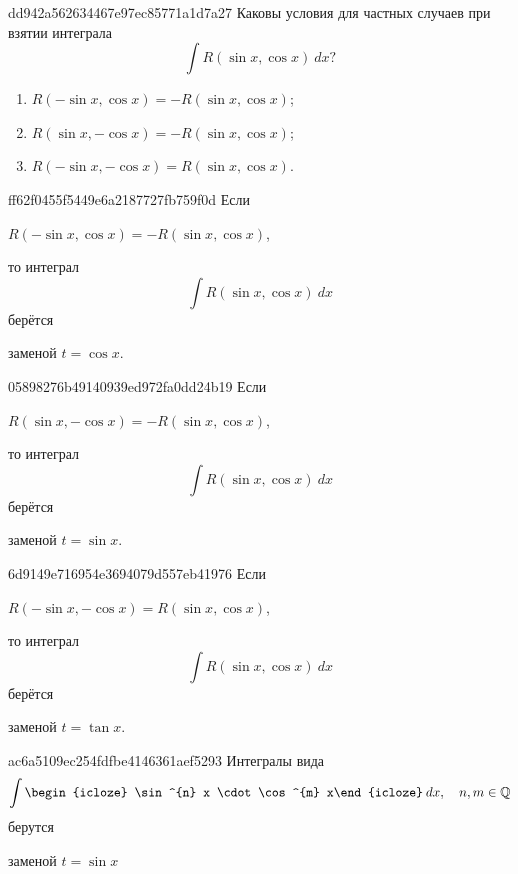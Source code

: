 \begin{note}{dd942a562634467e97ec85771a1d7a27}
    Каковы условия для частных случаев при взятии интеграла
    \[
        \int R(\sin x,  \cos x)\: dx?
    \]

    \begin{cloze}{1}
        \begin{enumerate}
            \item \({ R(-\sin x, \cos x) = -R(\sin x, \cos x) }\);
            \item \({ R(\sin x, -\cos x) = -R(\sin x, \cos x) }\);
            \item \({ R(-\sin x, -\cos x) = R(\sin x, \cos x) }\).
        \end{enumerate}
    \end{cloze}
\end{note}

\begin{note}{ff62f0455f5449e6a2187727fb759f0d}
    Если \begin{icloze}{2}\({ R(-\sin x, \cos x) = -R(\sin x, \cos x) }\),\end{icloze} то интеграл
    \[
        \int R(\sin x, \cos x)\: dx
    \]
    берётся \begin{icloze}{1}заменой \({ t = \cos x }\).\end{icloze}
\end{note}

\begin{note}{05898276b49140939ed972fa0dd24b19}
    Если \begin{icloze}{2}\({ R(\sin x, -\cos x) = -R(\sin x, \cos x) }\),\end{icloze} то интеграл
    \[
        \int R(\sin x, \cos x)\: dx
    \]
    берётся \begin{icloze}{1}заменой \({ t = \sin x }\).\end{icloze}
\end{note}

\begin{note}{6d9149e716954e3694079d557eb41976}
    Если \begin{icloze}{2}\({ R(-\sin x, -\cos x) = R(\sin x, \cos x) }\),\end{icloze} то интеграл
    \[
        \int R(\sin x, \cos x)\: dx
    \]
    берётся \begin{icloze}{1}заменой \({ t = \tan x }\).\end{icloze}
\end{note}

\begin{note}{ac6a5109ec254fdfbe4146361aef5293}
    Интегралы вида
    \[
        \int \begin{icloze}{2}\sin^{n} x \cdot \cos^{m} x\end{icloze}\: dx, \quad n, m \in \mathbb Q
    \]
    берутся \begin{icloze}{1}заменой \({ t = \sin x }\)\end{icloze}
\end{note}


